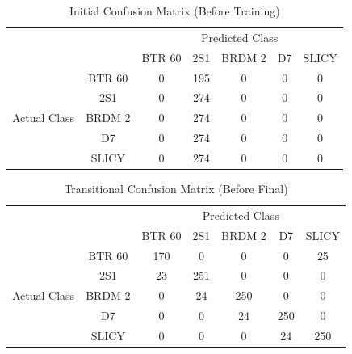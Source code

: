 \begin{table}
	\centering
	\begin{tabular}{|*{7}{c|}}
		
		\cline{3-7}
		\multicolumn{2}{c|}{}         & \multicolumn{5}{|c|}{Predicted Class} 			\\ \cline{3-7}
		\multicolumn{2}{c|}{}                  & BTR 60 & 2S1 & BRDM 2 & D7 & SLICY \\ \hline
		\multirow{5}{*}{\begin{turn}{90}Actual Class\end{turn}}
								      & BTR 60 & 0      & 195 & 0      & 0  & 0 	\\ \cline{2-7}
		                              & 2S1    & 0      & 274 & 0      & 0  & 0 	\\ \cline{2-7}
		                              & BRDM 2 & 0      & 274 & 0      & 0  & 0 	\\ \cline{2-7}
		                              & D7     & 0      & 274 & 0      & 0  & 0 	\\ \cline{2-7}
		                              & SLICY  & 0      & 274 & 0      & 0  & 0 	\\
		\hline
	\end{tabular}
	\label{tab:confusion0}
	\caption{Initial Confusion Matrix (Before Training)}
	\centering
\end{table}

\begin{table}
	\centering
	\begin{tabular}{|*{7}{c|}}
		
		\cline{3-7}
		\multicolumn{2}{c|}{}         & \multicolumn{5}{|c|}{Predicted Class} 			\\ \cline{3-7}
		\multicolumn{2}{c|}{}                  & BTR 60 & 2S1 & BRDM 2 & D7 & SLICY \\ \hline
		\multirow{5}{*}{\begin{turn}{90}Actual Class\end{turn}}
		& BTR 60 & 170    & 0   & 0      & 0  & 25	\\ \cline{2-7}
		& 2S1    & 23     & 251 & 0      & 0  & 0 	\\ \cline{2-7}
		& BRDM 2 & 0      & 24  & 250    & 0  & 0 	\\ \cline{2-7}
		& D7     & 0      & 0   & 24     & 250& 0 	\\ \cline{2-7}
		& SLICY  & 0      & 0   & 0      & 24 & 250 \\
		\hline
	\end{tabular}
	\label{tab:confusion_mid}
	\caption{Transitional Confusion Matrix (Before Final)}
	\centering
\end{table}

